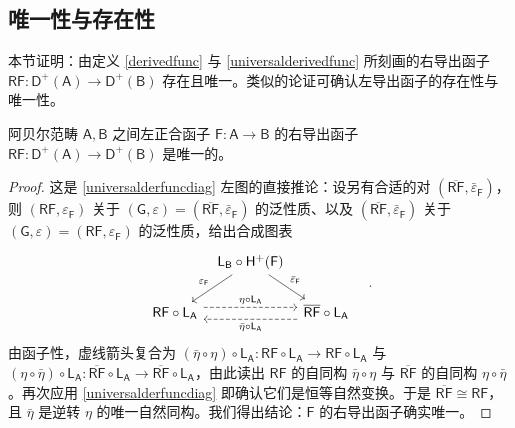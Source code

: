 \subsection{唯一性与存在性}\label{ch3.2}


本节证明：由定义 \ref{derivedfunc} 与 \ref{universalderivedfunc} 所刻画的右导出函子 $\mathsf{RF}:\mathsf{D^+(A)}\rightarrow\mathsf{D^+(B)}$ 存在且唯一。类似的论证可确认左导出函子的存在性与唯一性。

\begin{Lem}
	阿贝尔范畴 $\mathsf{A}, \mathsf{B}$ 之间左正合函子 $\mathsf{F}:\mathsf{A}\rightarrow\mathsf{B}$ 的右导出函子 $\mathsf{RF}:\mathsf{D^+(A)}\rightarrow\mathsf{D^+(B)}$ 是唯一的。
\end{Lem}

\begin{proof}
	这是 \eqref{universalderfuncdiag} 左图的直接推论：设另有合适的对 $(\overline{\mathsf{RF}},\bar{\varepsilon}_\mathsf{F})$，则 $(\mathsf{RF},\varepsilon_\mathsf{F})$ 关于 $(\mathsf{G},\varepsilon)=(\overline{\mathsf{RF}},\bar{\varepsilon}_\mathsf{F})$ 的泛性质、以及 $(\overline{\mathsf{RF}},\bar{\varepsilon}_\mathsf{F})$ 关于 $(\mathsf{G},\varepsilon)=(\mathsf{RF},\varepsilon_\mathsf{F})$ 的泛性质，给出合成图表
	\[
	\begin{tikzcd}[column sep=0.2cm]
		& \mathsf{L_B\circ H^+(F)}\arrow[dl, "\varepsilon_\mathsf{F}"']\arrow[dr, "\bar{\varepsilon}_\mathsf{F}"] & \\
		\mathsf{RF\circ L_A}\arrow[rr, dashed, yshift=1ex, "\eta\circ\mathsf{L_A}"] & & \overline{\mathsf{RF}}\circ\mathsf{L_A}\arrow[ll, dashed, yshift=-1ex, "\bar{\eta}\circ\mathsf{L_A}"]
	\end{tikzcd}\quad.
	\]
	由函子性，虚线箭头复合为 $(\bar{\eta}\circ\eta)\circ\mathsf{L_A}:\mathsf{RF}\circ\mathsf{L_A}\rightarrow\mathsf{RF}\circ\mathsf{L_A}$ 与 $(\eta\circ\bar{\eta})\circ\mathsf{L_A}:\overline{\mathsf{RF}}\circ\mathsf{L_A}\rightarrow\overline{\mathsf{RF}}\circ\mathsf{L_A}$，由此读出 $\mathsf{RF}$ 的自同构 $\bar{\eta}\circ\eta$ 与 $\overline{\mathsf{RF}}$ 的自同构 $\eta\circ\bar{\eta}$。再次应用 \eqref{universalderfuncdiag} 即确认它们是恒等自然变换。于是 $\overline{\mathsf{RF}}\cong\mathsf{RF}$，且 $\bar{\eta}$ 是逆转 $\eta$ 的唯一自然同构。我们得出结论：$\mathsf{F}$ 的右导出函子确实唯一。
\end{proof}

